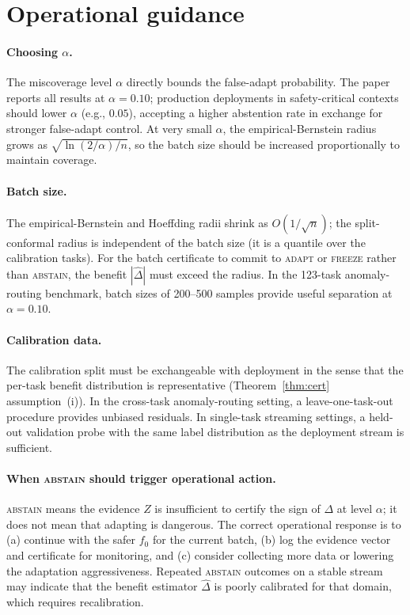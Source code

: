 \section{Operational guidance}
\label{sec:kga-ops}

\paragraph{Choosing $\alpha$.}
The miscoverage level $\alpha$ directly bounds the false-adapt probability.  The
paper reports all results at $\alpha = 0.10$; production deployments in
safety-critical contexts should lower $\alpha$ (e.g., $0.05$), accepting a
higher abstention rate in exchange for stronger false-adapt control.  At very
small $\alpha$, the empirical-Bernstein radius grows as $\sqrt{\ln(2/\alpha)/n}$,
so the batch size should be increased proportionally to maintain coverage.

\paragraph{Batch size.}
The empirical-Bernstein and Hoeffding radii shrink as $O(1/\sqrt{n})$;
the split-conformal radius is independent of the batch size (it is a quantile
over the calibration tasks).  For the batch certificate to commit to
\textsc{adapt} or \textsc{freeze} rather than \textsc{abstain}, the benefit
$|\widehat\Delta|$ must exceed the radius.  In the 123-task anomaly-routing
benchmark, batch sizes of 200--500 samples provide useful separation at
$\alpha = 0.10$.

\paragraph{Calibration data.}
The calibration split must be exchangeable with deployment in the sense that the
per-task benefit distribution is representative (Theorem~\ref{thm:cert}
assumption~(i)).  In the cross-task anomaly-routing setting, a leave-one-task-out
procedure provides unbiased residuals.  In single-task streaming settings, a
held-out validation probe with the same label distribution as the deployment
stream is sufficient.

\paragraph{When \textsc{abstain} should trigger operational action.}
\textsc{abstain} means the evidence $Z$ is insufficient to certify the sign of
$\Delta$ at level $\alpha$; it does not mean that adapting is dangerous.  The
correct operational response is to (a) continue with the safer $f_0$ for the
current batch, (b) log the evidence vector and certificate for monitoring, and
(c) consider collecting more data or lowering the adaptation aggressiveness.
Repeated \textsc{abstain} outcomes on a stable stream may indicate that the
benefit estimator $\widehat\Delta$ is poorly calibrated for that domain, which
requires recalibration.


